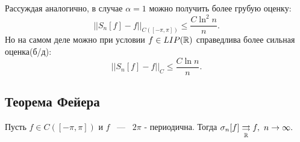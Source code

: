 \begin{remark}
    Рассуждая аналогично, в случае $\alpha = 1$ можно получить более грубую оценку: 
    $$
    ||S_n[f] - f||_{C([-\pi, \pi])} \le \frac{C\ln^2n}{n}.
    $$
    Но на самом деле можно при условии $f \in LIP(\mathbb{R})$ справедлива более сильная оценка(б/д): 
    $$
    ||S_n[f] - f||_C \le \frac{C \ln n}{n}.
    $$
\end{remark}

\subsection{Теорема Фейера}
\begin{theorem}
    Пусть $f \in C([-\pi, \pi])$ и $f$ ~---~ $2\pi$ - периодична. Тогда $\sigma_n[f] \underset{\mathbb{R}}{\rightrightarrows} f, \ n \rightarrow \infty.$
\end{theorem}
